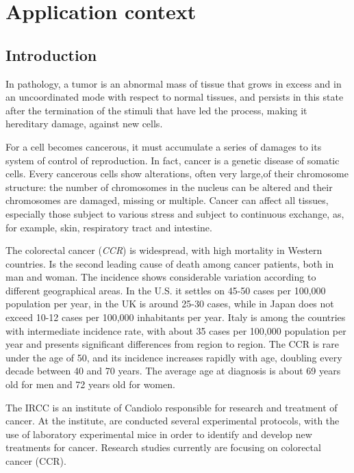 \chapter{Application context}\label{chap:xenocontest}

\section{Introduction}

In pathology, a tumor is an abnormal mass of tissue that grows in excess and in an uncoordinated mode with respect to normal tissues, and persists in this state after the termination of the stimuli that have led the process, making it hereditary damage, against new cells.

For a cell becomes cancerous, it must accumulate a series of damages to its system of control of reproduction. In fact, cancer is a genetic disease of somatic cells. Every cancerous cells show alterations, often very large,of their chromosome structure: the number of chromosomes in the nucleus can be altered and their chromosomes are damaged, missing or multiple. Cancer can affect all tissues, especially those subject to various stress and subject to continuous exchange, as, for example, skin, respiratory tract and intestine.

The colorectal cancer (\textit{CCR}) is widespread, with high mortality in Western countries. Is the second leading cause of death among cancer patients, both in man and woman. The incidence shows considerable variation according to different geographical areas. In the U.S. it settles on 45-50 cases per 100,000 population per year, in the UK is around 25-30 cases, while in Japan does not exceed 10-12 cases per 100,000 inhabitants per year. Italy is among the countries with intermediate incidence rate, with about 35 cases per 100,000 population per year and presents significant differences from region to region. The CCR is rare under the age of 50, and its incidence increases rapidly with age, doubling every decade between 40 and 70 years. The average age at diagnosis is about 69 years old for men and 72 years old for women.

The IRCC is an institute of Candiolo responsible for research and treatment of cancer. At the institute, are conducted several experimental protocols, with the use of laboratory experimental mice in order to identify and develop new treatments for cancer. Research studies currently are focusing on colorectal cancer (CCR).

